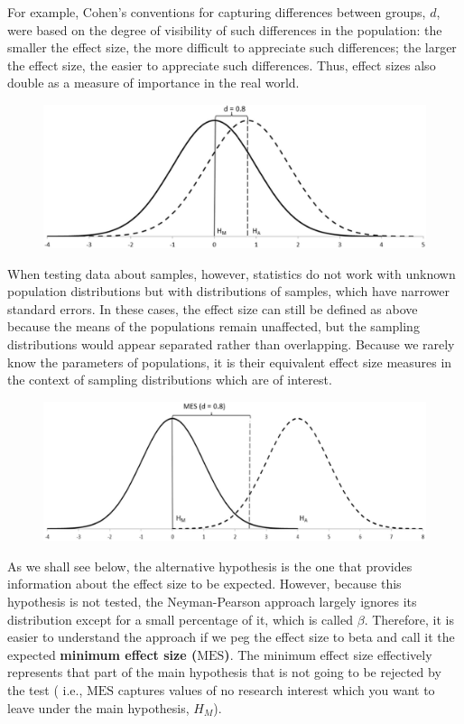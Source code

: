\documentclass[
]{book}
\theoremstyle{definition}
\theoremstyle{definition}
\theoremstyle{definition}
\theoremstyle{definition}
\theoremstyle{remark}
\begin{document}
For example, Cohen's \citeyearpar{Cohen88} conventions for capturing differences between groups, \(d\), were based on the degree of visibility of such differences in the population: the smaller the effect size, the more difficult to appreciate such differences; the larger the effect size, the easier to appreciate such differences. Thus, effect sizes also double as a measure of importance in the real world.

\begin{figure}

{\centering \includegraphics[width=0.6\linewidth]{images/Perezgonzalez2015Fig2} 

}

\end{figure}

When testing data about samples, however, statistics do not work with unknown population distributions but with distributions of samples, which have narrower standard errors. In these cases, the effect size can still be defined as above because the means of the populations remain unaffected, but the sampling distributions would appear separated rather than overlapping. Because we rarely know the parameters of populations, it is their equivalent effect size measures in the context of sampling distributions which are of interest.

\begin{figure}

{\centering \includegraphics[width=0.6\linewidth]{images/Perezgonzalez2015Fig3} 

}

\end{figure}

As we shall see below, the alternative hypothesis is the one that provides information about the effect size to be expected. However, because this hypothesis is not tested, the Neyman-Pearson approach largely ignores its distribution except for a small percentage of it, which is called \(\beta\). Therefore, it is easier to understand the approach if we peg the effect size to beta and call it the expected \textbf{minimum effect size (\(\mbox{MES}\))}. The minimum effect size effectively represents that part of the main hypothesis that is not going to be rejected by the test ( i.e., \(\mbox{MES}\) captures values of no research interest which you want to leave under the main hypothesis, \(H_M\)).
\end{document}
